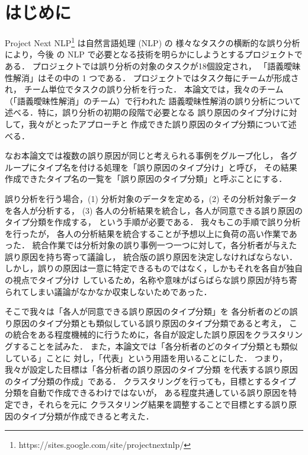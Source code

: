 \documentclass[japanese]{jnlp_1.4}
\begin{document}
\maketitle


\section{はじめに}

Project Next NLP\footnote{https://sites.google.com/site/projectnextnlp/} は自然言語処理 (NLP) の
様々なタスクの横断的な誤り分析により，今後
の NLP で必要となる技術を明らかにしようとするプロジェクトである．
プロジェクトでは誤り分析の対象のタスクが18個設定され，
「語義曖昧性解消」はその中の 1 つである．
プロジェクトではタスク毎にチームが形成され，
チーム単位でタスクの誤り分析を行った．
本論文では，我々のチーム（「語義曖昧性解消」のチーム）で行われた
語義曖昧性解消の誤り分析について述べる．特に，誤り分析の初期の段階で必要となる
誤り原因のタイプ分けに対して，我々がとったアプローチと
作成できた誤り原因のタイプ分類について述べる．

なお本論文では複数の誤り原因が同じと考えられる事例をグループ化し，
各グループにタイプ名を付ける処理を「誤り原因のタイプ分け」と呼び，
その結果作成できたタイプ名の一覧を「誤り原因のタイプ分類」と呼ぶことにする．

誤り分析を行う場合，(1) 分析対象のデータを定める，(2) その分析対象データを各人が分析する，
(3) 各人の分析結果を統合し，各人が同意できる誤り原因のタイプ分類を作成する，
という手順が必要である．
我々もこの手順で誤り分析を行ったが，
各人の分析結果を統合することが予想以上に負荷の高い作業であった．
統合作業では分析対象の誤り事例一つ一つに対して，各分析者が与えた誤り原因を持ち寄って議論し，
統合版の誤り原因を決定しなければならない．
しかし，誤りの原因は一意に特定できるものではなく，しかもそれを各自が独自の視点でタイプ分け
しているため，名称や意味がばらばらな誤り原因が持ち寄られてしまい議論がなかなか収束しないためであった．

そこで我々は「各人が同意できる誤り原因のタイプ分類」を
各分析者のどの誤り原因のタイプ分類とも類似している誤り原因のタイプ分類であると考え，
この統合をある程度機械的に行うために，各自が設定した誤り原因をクラスタリングすることを試みた．
また，本論文では「各分析者のどのタイプ分類とも類似している」ことに
対し，「代表」という用語を用いることにした．
つまり，我々が設定した目標は「各分析者の誤り原因のタイプ分類
を代表する誤り原因のタイプ分類の作成」である．
クラスタリングを行っても，目標とするタイプ分類を自動で作成できるわけではないが，
ある程度共通している誤り原因を特定でき，それらを元に
クラスタリング結果を調整することで目標とする誤り原因のタイプ分類が作成できると考えた．
\end{document}
